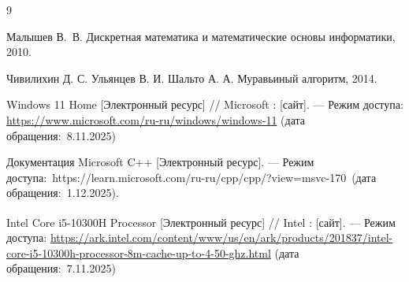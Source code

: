 \begin{thebibliography}{9}
	
	Малышев В.~В.
	Дискретная математика и математические основы информатики, 2010.
	
	Чивилихин Д. С. Ульянцев В. И. Шальто А. А. Муравьиный алгоритм, 2014.
	
	
	Windows 11 Home [Электронный ресурс] // Microsoft : [сайт]. --- Режим доступа: \url{https://www.microsoft.com/ru-ru/windows/windows-11} (дата обращения:~8.11.2025)
	
	
	Документация Microsoft C++ [Электронный ресурс]. --- Режим доступа:~https://learn.microsoft.com/ru-ru/cpp/cpp/?view=msvc-170~(дата обращения:~1.12.2025).


	Intel\textsuperscript{\textregistered} Core\texttrademark{} i5-10300H Processor [Электронный ресурс] // Intel : [сайт]. --- Режим доступа: \url{https://ark.intel.com/content/www/us/en/ark/products/201837/intel-core-i5-10300h-processor-8m-cache-up-to-4-50-ghz.html} (дата обращения:~7.11.2025)
	
\end{thebibliography}
